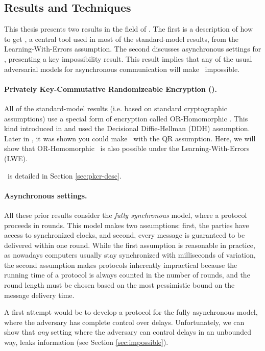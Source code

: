\subsection{Results and Techniques}
This thesis presents two results in the field of \THC. The first is a description of how to get \PKCR, a central tool used in most of the standard-model results, from the Learning-With-Errors assumption. The second discusses asynchronous settings for \THC, presenting a key impossibility result. This result implies that any of the usual adversarial models for asynchronous communication will make \THC~impossible.

\paragraph{Privately Key-Commutative Randomizeable Encryption (\PKCR).}
All of the standard-model results (i.e. based on standard cryptographic assumptions) use a special form of encryption called OR-Homomorphic \PKCR. This kind introduced in \cite{EC:AkaMor17} and used the Decisional Diffie-Hellman (DDH) assumption. Later in \cite{EPRINT:AkaLaVMor17}, it was shown you could make \PKCR~with the QR assumption. Here, we will show that OR-Homomorphic \PKCR~is also possible under the Learning-With-Errors (LWE).

\PKCR~is detailed in Section \ref{sec:pkcr-desc}.

\paragraph{Asynchronous settings.} All these prior results consider the \emph{fully synchronous} model, where a protocol proceeds in rounds. This model makes
two assumptions: first, the parties have access to synchronized clocks, and 
second, every message is guaranteed to be delivered within one round.
While the first assumption is reasonable in practice, as nowadays computers 
usually stay synchronized with milliseconds of variation, the second assumption 
makes protocols inherently impractical because the running time of a protocol is always counted in the number of rounds, and the round length must be chosen based on the most pessimistic bound on the message delivery time.

A first attempt would be to develop a protocol for the fully asynchronous model, where the adversary has complete control over delays. Unfortunately, we can show that \emph{any} setting where the adversary can control delays in an unbounded way, leaks information (see Section \ref{sec:impossible}).
